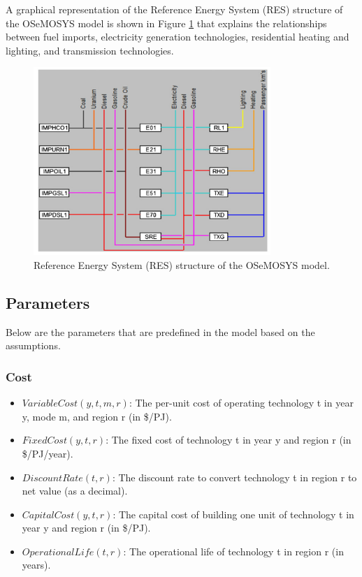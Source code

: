 \documentclass[11pt]{article}
\begin{document}
A graphical representation of the Reference Energy System (RES) structure of the OSeMOSYS model is shown in Figure \ref{fig:osemosys_structure} that explains the relationships between fuel imports, electricity generation technologies, residential heating and lighting, and transmission technologies.
\begin{figure}[H]
    \centering
    \includegraphics[width=0.8\textwidth]{visualizations/RES}
    \caption{Reference Energy System (RES) structure of the OSeMOSYS model.}
    \label{fig:osemosys_structure}
\end{figure}

\subsection{Parameters}
Below are the parameters that are predefined in the model based on the assumptions.

\subsubsection{Cost}
\begin{itemize}
    \item $VariableCost(y,t,m,r)$: The per-unit cost of operating technology t in year y, mode m, and region r (in \$/PJ).
    \item $FixedCost(y,t,r)$: The fixed cost of technology t in year y and region r (in \$/PJ/year).
    \item $DiscountRate(t,r)$: The discount rate to convert technology t in region r to net value (as a decimal).
    \item $CapitalCost(y,t,r)$: The capital cost of building one unit of technology t in year y and region r (in \$/PJ).
    \item $OperationalLife(t,r)$: The operational life of technology t in region r (in years).
\end{itemize}
\end{document}
